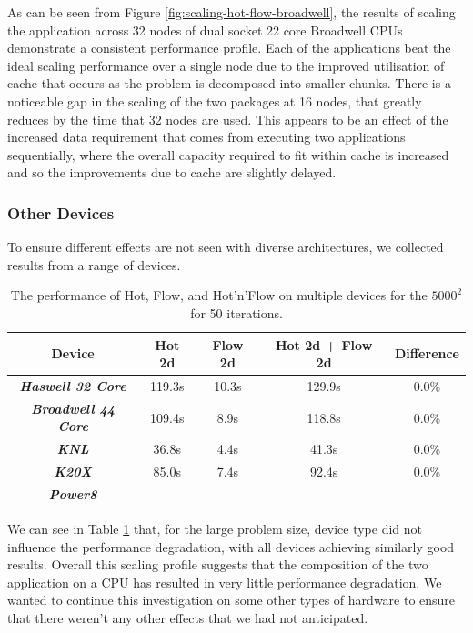 \documentclass[runningheads,a4paper]{llncs}
\begin{document}
As can be seen from Figure \ref{fig:scaling-hot-flow-broadwell}, the results of scaling the application across 32 nodes of dual socket 22 core Broadwell CPUs demonstrate a consistent performance profile. Each of the applications beat the ideal scaling performance over a single node due to the improved utilisation of cache that occurs as the problem is decomposed into smaller chunks. There is a noticeable gap in the scaling of the two packages at 16 nodes, that greatly reduces by the time that 32 nodes are used. This appears to be an effect of the increased data requirement that comes from executing two applications sequentially, where the overall capacity required to fit within cache is increased and so the improvements due to cache are slightly delayed.

\subsubsection{Other Devices}

To ensure different effects are not seen with diverse architectures, we collected results from a range of devices.

\begin{table}[h]
  \begin{center}
    \begin{tabular}{c|c|c|c|c}
      \hline
      \textbf{Device} & \textbf{Hot 2d} & \textbf{Flow 2d} & \textbf{Hot 2d + Flow 2d} & \textbf{Difference} \\
      \hline
      \textit{\textbf{Haswell 32 Core}} & 119.3s & 10.3s & 129.9s & 0.0\% \\
      \textit{\textbf{Broadwell 44 Core}} & 109.4s & 8.9s & 118.8s & 0.0\% \\
      \textit{\textbf{KNL}} & 36.8s & 4.4s & 41.3s & 0.0\% \\
      \textit{\textbf{K20X}} & 85.0s & 7.4s & 92.4s & 0.0\% \\
      \textit{\textbf{Power8}} & & & & \\
    \end{tabular}
  \end{center}
  \caption{The performance of Hot, Flow, and Hot'n'Flow on multiple devices for the $5000^2$ for 50 iterations.}
  \label{tab:hot-flow-multi-device}
\end{table}

We can see in Table \ref{tab:hot-flow-multi-device} that, for the large problem size, device type did not influence the performance degradation, with all devices achieving similarly good results. Overall this scaling profile suggests that the composition of the two application on a CPU has resulted in very little performance degradation. We wanted to continue this investigation on some other types of hardware to ensure that there weren't any other effects that we had not anticipated.
\end{document}
